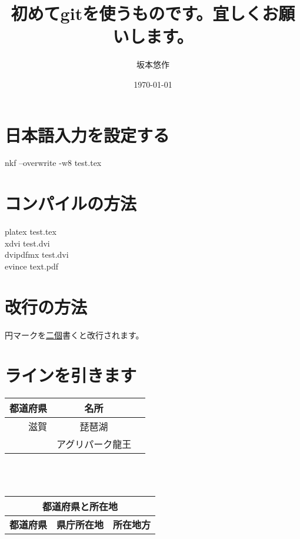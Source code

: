 \documentclass{jarticle}
\title{初めてgitを使うものです。宜しくお願いします。}
\author{坂本悠作}
\date{\today}
\begin{document}
\maketitle
\newpage

\begin{multicols}{2}
\section{日本語入力を設定する}
nkf --overwrite -w8 test.tex\\
\section{コンパイルの方法}
platex test.tex\\
xdvi test.dvi\\
dvipdfmx test.dvi\\
evince text.pdf
\section{改行の方法}
円マークを\underline{二個}書くと改行されます。
\section{ラインを引きます}
\begin{tabular}{|r||c|c|}
\hline
\textbf{都道府県}&\textbf{名所}\\
\hline
滋賀&琵琶湖\\
\cline{2-2}
&アグリパーク龍王\\
\hline
\end{tabular}
\\
\vspace{10mm}
\\
\begin{tabular}{|l|l|l|}
\hline
\multicolumn{3}{|c|}{\textbf{都道府県と所在地}}\\
\hline
\multicolumn{1}{|c||}{\textbf{都道府県}}&\multicolumn{1}{c|}{\textbf{県庁所在地}}&\multicolumn{1}{c|}{\textbf{所在地方}}\\
\hline
\end{tabular}


\end{multicols}
\end{document}
